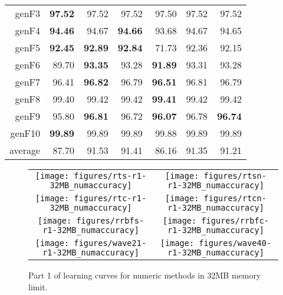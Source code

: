 \begin{table}
\begin{tabular}{|r||r|r|r||r|r|r|}
{\sc genF3} & \textbf{97.52} & 97.52 & 97.52 & 97.50 & 97.52 & 97.52 \\
{\sc genF4} & \textbf{94.46} & 94.67 & \textbf{94.66} & 93.68 & 94.67 & 94.65 \\
{\sc genF5} & \textbf{92.45} & \textbf{92.89} & \textbf{92.84} & 71.73 & 92.36 & 92.15 \\
{\sc genF6} & 89.70 & \textbf{93.35} & 93.28 & \textbf{91.89} & 93.31 & 93.28 \\
{\sc genF7} & 96.41 & \textbf{96.82} & 96.79 & \textbf{96.51} & 96.81 & 96.79 \\
{\sc genF8} & 99.40 & 99.42 & 99.42 & \textbf{99.41} & 99.42 & 99.42 \\
{\sc genF9} & 95.80 & \textbf{96.81} & 96.72 & \textbf{96.07} & 96.78 & \textbf{96.74} \\
{\sc genF10} & \textbf{99.89} & 99.89 & 99.89 & 99.88 & 99.89 & 99.89 \\
\hline
average & 87.70 & 91.53 & 91.41 & 86.16 & 91.35 & 91.21 \\
\hline
\end{tabular}
\end{table}

\begin{figure}
\centering
\begin{tabular}{c@{}c}
\texttt{[image: figures/rts-r1-32MB\_numaccuracy]} &
\texttt{[image: figures/rtsn-r1-32MB\_numaccuracy]} \\
\texttt{[image: figures/rtc-r1-32MB\_numaccuracy]} &
\texttt{[image: figures/rtcn-r1-32MB\_numaccuracy]} \\
\texttt{[image: figures/rrbfs-r1-32MB\_numaccuracy]} &
\texttt{[image: figures/rrbfc-r1-32MB\_numaccuracy]} \\
\texttt{[image: figures/wave21-r1-32MB\_numaccuracy]} &
\texttt{[image: figures/wave40-r1-32MB\_numaccuracy]} \\
\end{tabular}
\caption{Part 1 of learning curves for numeric methods in 32MB memory limit.}
\label{fig:32MB_num1}
\end{figure}

